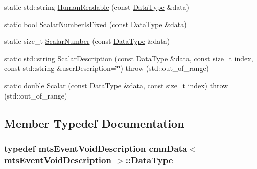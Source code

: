 \begin{DoxyCompactItemize}
\item 
static std\+::string \hyperlink{classcmn_data_3_01mts_event_void_description_01_4_a0cd94a6df68ef8a3aef6a44ea7bbc69d}{Human\+Readable} (const \hyperlink{classcmn_data_3_01mts_event_void_description_01_4_ae99d827ac01b4f0ef589606af2924260}{Data\+Type} \&data)
\item 
static bool \hyperlink{classcmn_data_3_01mts_event_void_description_01_4_ae8e860b80362aa7b63972b1236308f97}{Scalar\+Number\+Is\+Fixed} (const \hyperlink{classcmn_data_3_01mts_event_void_description_01_4_ae99d827ac01b4f0ef589606af2924260}{Data\+Type} \&data)
\item 
static size\+\_\+t \hyperlink{classcmn_data_3_01mts_event_void_description_01_4_aeac049bd2f8c1f8e0c46c3fb3ce61bcd}{Scalar\+Number} (const \hyperlink{classcmn_data_3_01mts_event_void_description_01_4_ae99d827ac01b4f0ef589606af2924260}{Data\+Type} \&data)
\item 
static std\+::string \hyperlink{classcmn_data_3_01mts_event_void_description_01_4_a055496c23878a3ad2268c1ed1bbb713f}{Scalar\+Description} (const \hyperlink{classcmn_data_3_01mts_event_void_description_01_4_ae99d827ac01b4f0ef589606af2924260}{Data\+Type} \&data, const size\+\_\+t index, const std\+::string \&user\+Description=\char`\"{}\char`\"{})  throw (std\+::out\+\_\+of\+\_\+range)
\item 
static double \hyperlink{classcmn_data_3_01mts_event_void_description_01_4_ab08f27128dcb154bd701920a243bb623}{Scalar} (const \hyperlink{classcmn_data_3_01mts_event_void_description_01_4_ae99d827ac01b4f0ef589606af2924260}{Data\+Type} \&data, const size\+\_\+t index)  throw (std\+::out\+\_\+of\+\_\+range)
\end{DoxyCompactItemize}


\subsection{Member Typedef Documentation}
\hypertarget{classcmn_data_3_01mts_event_void_description_01_4_ae99d827ac01b4f0ef589606af2924260}{}
\subsubsection[{Data\+Type}]{\setlength{\rightskip}{0pt plus 5cm}typedef {\bf mts\+Event\+Void\+Description} {\bf cmn\+Data}$<$ {\bf mts\+Event\+Void\+Description} $>$\+::{\bf Data\+Type}}\label{classcmn_data_3_01mts_event_void_description_01_4_ae99d827ac01b4f0ef589606af2924260}


